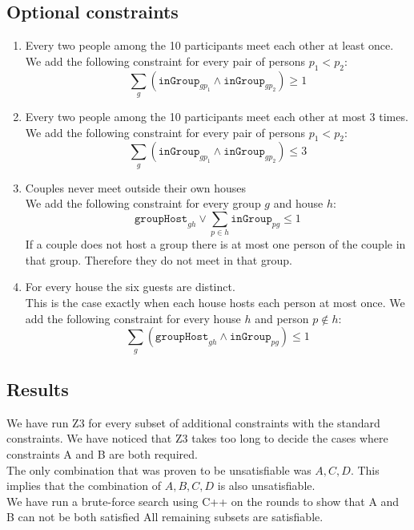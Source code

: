\documentclass{scrartcl}
\begin{document}
\begin{itemize}
\subsection{Optional constraints} %
\label{sub:dinner_optional_constraints}
\begin{enumerate}[label=\Alph*)]
	\item Every two people among the 10 participants meet each other at least once.\\
	We add the following constraint for every pair of persons $p_1<p_2$:
	$$\sum_g(\mathtt{inGroup}_{gp_1}\land\mathtt{inGroup}_{gp_2})\geq 1$$
	\item Every two people among the 10 participants meet each other at most $3$ times.\\
	We add the following constraint for every pair of persons $p_1<p_2$:
	$$\sum_g(\mathtt{inGroup}_{gp_1}\land\mathtt{inGroup}_{gp_2})\leq 3$$
	\item Couples never meet outside their own houses\\
	We add the following constraint for every group $g$ and house $h$:
	$$\mathtt{groupHost}_{gh}\lor\sum_{p\in h}\mathtt{inGroup}_{pg}\leq 1$$
	If a couple does not host a group there is at most one person of the couple in that group. Therefore they do not meet in that group.
	\item For every house the six guests are distinct.\\
	This is the case exactly when each house hosts each person at most once.
	We add the following constraint for every house $h$ and person $p\notin h$:
	$$\sum_{g}(\mathtt{groupHost}_{gh}\land \mathtt{inGroup}_{pg})\leq 1$$
\end{enumerate}

\subsection{Results} %
\label{sub:dinner_results}
We have run Z3 for every subset of additional constraints with the standard constraints.
We have noticed that Z3 takes too long to decide the cases where constraints A and B are both required.\\
The only combination that was proven to be unsatisfiable was $A,C,D$. This implies that the combination of $A,B,C,D$ is also unsatisfiable.\\
We have run a brute-force search using C++ on the rounds to show that A and B can not be both satisfied
All remaining subsets are satisfiable.\\


\end{itemize}
\end{document}
